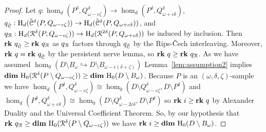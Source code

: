 \begin{proof}
  Let $q : \hom_d(P^\delta, Q_{\omega-c\zeta}^\delta)\to \hom_d(P^\delta, Q_{\omega+c\delta}^\delta)$,
  $q_{\check{\mathcal{C}}} : \mathrm{H}_d(\check{\mathcal{C}}^{\delta}(P, Q_{\omega-c\zeta}))\to\mathrm{H}_d(\check{\mathcal{C}}^{\delta}(P, Q_{\omega+c\delta}))$, and
  $q_{\mathcal{R}} : \mathrm{H}_d(\mathcal{R}^{\delta}(P, Q_{\omega-c\zeta}))\to\mathrm{H}_d(\mathcal{R}^{2\delta}(P, Q_{\omega+c\delta}))$ be induced by inclusion.
  Then $\mathbf{rk}~q_{\check{\mathcal{C}}} \geq\mathbf{rk}~q_{\mathcal{R}}$ as $q_{\mathcal{R}}$ factors through $q_{\check{\mathcal{C}}}$ by the Rips-\v Cech interleaving.
  Moreover, $\mathbf{rk}~q = \mathbf{rk}~q_{\check{\mathcal{C}}}$ by the persistent nerve lemma, so $\mathbf{rk}~q\geq \mathbf{rk}~q_{\mathcal{R}}$.
  As we have assumed $\hom_0(D\setminus B_\omega\hookrightarrow D\setminus B_{\omega-c(\delta+\zeta)})$ Lemma~\ref{lem:assumption2} implies $\mathbf{dim}~\mathrm{H}_0(\mathcal{R}^\delta(P\setminus Q_{\omega-c\zeta}))\geq \mathbf{dim}~\mathrm{H}_0(D\setminus B_\omega)$.
  Because $P$ is an $(\omega, \delta, \zeta)$-sample we have $\hom_d(P^\delta, Q_{\omega-c\zeta}^\delta)\cong \hom_0(D\setminus Q_{\omega-c\zeta}^\delta, D\setminus P^\delta)$ and $\hom_d(P^\delta, Q_{\omega+c\delta}^\delta)\cong \hom_0(D\setminus Q_{\omega-2c\delta}^\delta, D\setminus P^\delta)$ so $\mathbf{rk}~i\geq \mathbf{rk}~q$ by Alexander Duality and the Universal Coefficient Theorem.
  So, by our hypothesis that $\mathbf{rk}~q_{\mathcal{R}}\geq\mathbf{dim}~\mathrm{H}_0(\mathcal{R}^\delta(P\setminus Q_{\omega-c\zeta}))$ we have $\mathbf{rk}~i\geq\mathbf{dim}~\mathrm{H}_0(D\setminus B_\omega)$.


\end{proof}

